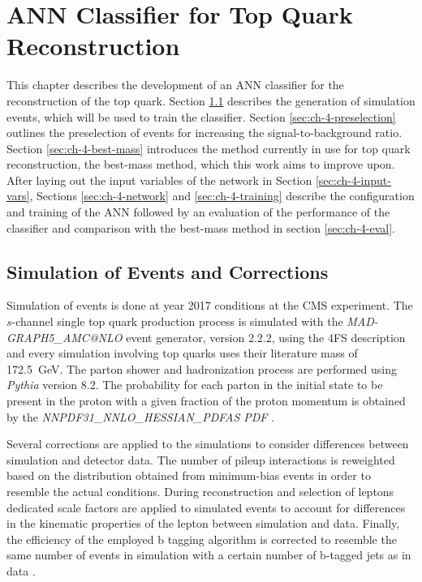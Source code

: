 \chapter{ANN Classifier for Top Quark Reconstruction}
\label{ch:classifier}

This chapter describes the development of an ANN classifier for the reconstruction of the top quark.
Section \ref{sec:ch-4-simulation} describes the generation of simulation events, which will be used to train the classifier. Section \ref{sec:ch-4-preselection} outlines the preselection of events for increasing the signal-to-background ratio. Section \ref{sec:ch-4-best-mass} introduces the method currently in use for top quark reconstruction, the best-mass method, which this work aims to improve upon. After laying out the input variables of the network in Section \ref{sec:ch-4-input-vars}, Sections \ref{sec:ch-4-network} and \ref{sec:ch-4-training} describe the configuration and training of the ANN followed by an evaluation of the performance of the classifier and comparison with the best-mass method in section \ref{sec:ch-4-eval}.

\section{Simulation of Events and Corrections}
\label{sec:ch-4-simulation}
Simulation of events is done at year 2017 conditions at the CMS experiment. The $s$-channel single top quark production process is simulated with the \emph{MAD-GRAPH5\_AMC@NLO} event generator, version 2.2.2, using the 4FS description \cite{Fal18} and every simulation involving top quarks uses their literature mass of \SI{172.5}{GeV}. The parton shower and hadronization process are performed using \emph{Pythia} version 8.2. The probability for each parton in the initial state to be present in the proton with a given fraction of the proton momentum is obtained by the \emph{NNPDF31\_NNLO\_HESSIAN\_PDFAS PDF} \cite{Fal18}.

Several corrections are applied to the simulations to consider differences between simulation and detector data. The number of pileup interactions is reweighted based on the distribution obtained from minimum-bias events in order to resemble the actual conditions. During reconstruction and selection of leptons dedicated scale factors are applied to simulated events to account for differences in the kinematic properties of the lepton between simulation and data. Finally, the efficiency of the employed b tagging algorithm is corrected to resemble the same number of events in simulation with a certain number of b-tagged jets as in data \cite{Fal18}.

